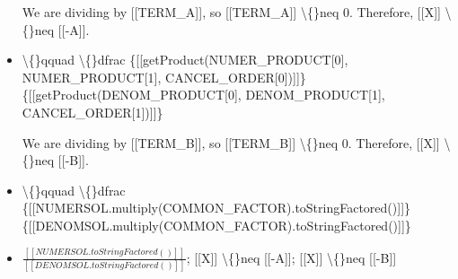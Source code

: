 \documentclass{article}
\begin{document}
\begin{itemize}
                We are dividing by [[TERM\_A]], so [[TERM\_A]] \textbackslash\{\}neq 0.
                Therefore, [[X]] \textbackslash\{\}neq [[-A]].
  \item \textbackslash\{\}qquad \textbackslash\{\}dfrac
                    \{[[getProduct(NUMER\_PRODUCT[0], NUMER\_PRODUCT[1], CANCEL\_ORDER[0])]]\}
                    \{[[getProduct(DENOM\_PRODUCT[0], DENOM\_PRODUCT[1], CANCEL\_ORDER[1])]]\}
                

                We are dividing by [[TERM\_B]], so [[TERM\_B]] \textbackslash\{\}neq 0.
                Therefore, [[X]] \textbackslash\{\}neq [[-B]].
  \item \textbackslash\{\}qquad \textbackslash\{\}dfrac
                    \{[[NUMERSOL.multiply(COMMON\_FACTOR).toStringFactored()]]\}
                    \{[[DENOMSOL.multiply(COMMON\_FACTOR).toStringFactored()]]\}
  \item $\frac{[[NUMERSOL.toStringFactored()]]}{[[DENOMSOL.toStringFactored()]]}$;
                [[X]] \textbackslash\{\}neq [[-A]]; [[X]] \textbackslash\{\}neq [[-B]]
\end{itemize}
\end{document}
